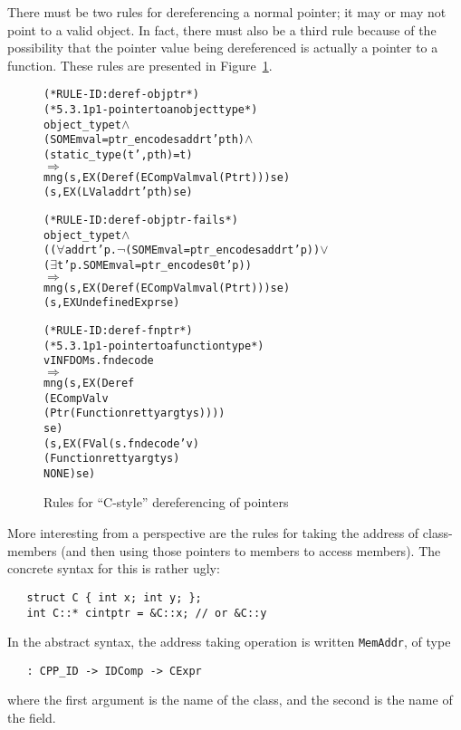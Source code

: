 \documentclass[11pt]{article}
\begin{document}
There must be two rules for dereferencing a normal pointer; it may or
may not point to a valid object.  In fact, there must also be a third
rule because of the possibility that the pointer value being
dereferenced is actually a pointer to a function. These rules are presented in
Figure~\ref{fig:deref-rules}.
\begin{figure}[htbp]
%
%
%
%
\begin{alltt}
(* RULE-ID: deref-objptr *)
(* 5.3.1 p1 - pointer to an object type *)
     object_type t \(\land\)
     (SOME mval = ptr_encode s addr t' pth) \(\land\)
     (static_type (t',pth) = t)
   \(\Rightarrow\)
     mng (s, EX (Deref (ECompVal mval (Ptr t))) se)
         (s, EX (LVal addr t' pth) se)


(* RULE-ID: deref-objptr-fails *)
     object_type t \(\land\)
     ((\(\forall\)addr t' p. \(\neg\)(SOME mval = ptr_encode s addr t' p)) \(\lor\)
      (\(\exists\)t' p. SOME mval = ptr_encode s 0 t' p))
   \(\Rightarrow\)
     mng (s, EX (Deref (ECompVal mval (Ptr t))) se)
         (s, EX UndefinedExpr se)


(* RULE-ID: deref-fnptr *)
(* 5.3.1 p1 - pointer to a function type *)
     v IN FDOM s.fndecode
   \(\Rightarrow\)
     mng (s, EX (Deref
                  (ECompVal v
                            (Ptr (Function retty argtys))))
                se)
         (s, EX (FVal (s.fndecode ' v)
                      (Function retty argtys)
                      NONE) se)
\end{alltt}
\caption{Rules for ``C-style'' dereferencing of pointers}
\label{fig:deref-rules}
\end{figure}

\medskip
\noindent More interesting from a \cpp{} perspective are the rules for
taking the address of class-members (and then using those pointers to
members to access members).  The concrete syntax for this is
rather ugly:
\begin{verbatim}
   struct C { int x; int y; };
   int C::* cintptr = &C::x; // or &C::y
\end{verbatim}
%
In the abstract syntax, the address taking operation is written
\texttt{MemAddr}, of type
\begin{verbatim}
   : CPP_ID -> IDComp -> CExpr
\end{verbatim}
where the first argument is the name of the class, and the second is
the name of the field.
\end{document}

